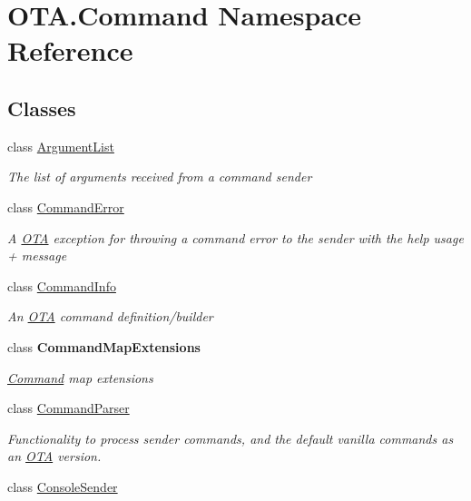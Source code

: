\hypertarget{namespace_o_t_a_1_1_command}{}\section{O\+T\+A.\+Command Namespace Reference}
\label{namespace_o_t_a_1_1_command}
\subsection*{Classes}
\begin{DoxyCompactItemize}
\item 
class \hyperlink{class_o_t_a_1_1_command_1_1_argument_list}{Argument\+List}
\begin{DoxyCompactList}\small\item\em The list of arguments received from a command sender \end{DoxyCompactList}\item 
class \hyperlink{class_o_t_a_1_1_command_1_1_command_error}{Command\+Error}
\begin{DoxyCompactList}\small\item\em A \hyperlink{namespace_o_t_a}{O\+T\+A} exception for throwing a command error to the sender with the help usage + message \end{DoxyCompactList}\item 
class \hyperlink{class_o_t_a_1_1_command_1_1_command_info}{Command\+Info}
\begin{DoxyCompactList}\small\item\em An \hyperlink{namespace_o_t_a}{O\+T\+A} command definition/builder \end{DoxyCompactList}\item 
class {\bfseries Command\+Map\+Extensions}
\begin{DoxyCompactList}\small\item\em \hyperlink{namespace_o_t_a_1_1_command}{Command} map extensions \end{DoxyCompactList}\item 
class \hyperlink{class_o_t_a_1_1_command_1_1_command_parser}{Command\+Parser}
\begin{DoxyCompactList}\small\item\em Functionality to process sender commands, and the default vanilla commands as an \hyperlink{namespace_o_t_a}{O\+T\+A} version. \end{DoxyCompactList}\item 
class \hyperlink{class_o_t_a_1_1_command_1_1_console_sender}{Console\+Sender}

\end{DoxyCompactItemize}
